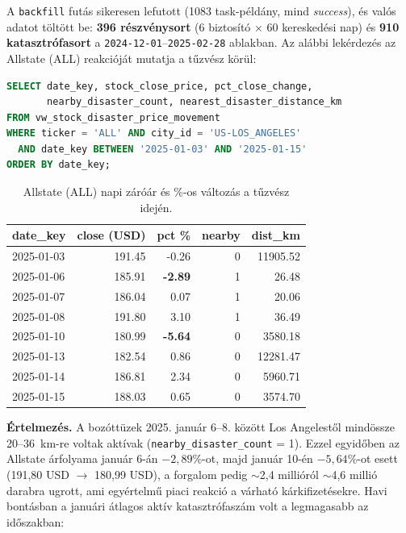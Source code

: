 \documentclass[11pt,a4paper]{article}
\begin{document}
A \texttt{backfill} futás sikeresen lefutott (1083 task-példány, mind
\emph{success}), és valós adatot töltött be: \textbf{396 részvénysort}
(6 biztosító × 60 kereskedési nap) és \textbf{910 katasztrófasort} a
\texttt{2024-12-01}--\texttt{2025-02-28} ablakban. Az alábbi lekérdezés az
Allstate (ALL) reakcióját mutatja a tűzvész körül:

\begin{lstlisting}[language=SQL]
SELECT date_key, stock_close_price, pct_close_change,
       nearby_disaster_count, nearest_disaster_distance_km
FROM vw_stock_disaster_price_movement
WHERE ticker = 'ALL' AND city_id = 'US-LOS_ANGELES'
  AND date_key BETWEEN '2025-01-03' AND '2025-01-15'
ORDER BY date_key;
\end{lstlisting}

\begin{table}[ht]
\centering\footnotesize
\begin{tabular}{@{}lrrrr@{}}
\toprule
\textbf{date\_key} & \textbf{close (USD)} & \textbf{pct \%} & \textbf{nearby} & \textbf{dist\_km} \\
\midrule
2025-01-03 & 191.45 & -0.26 & 0 & 11905.52 \\
2025-01-06 & 185.91 & \textbf{-2.89} & 1 & 26.48 \\
2025-01-07 & 186.04 & 0.07 & 1 & 20.06 \\
2025-01-08 & 191.80 & 3.10 & 1 & 36.49 \\
2025-01-10 & 180.99 & \textbf{-5.64} & 0 & 3580.18 \\
2025-01-13 & 182.54 & 0.86 & 0 & 12281.47 \\
2025-01-14 & 186.81 & 2.34 & 0 & 5960.71 \\
2025-01-15 & 188.03 & 0.65 & 0 & 3574.70 \\
\bottomrule
\end{tabular}
\caption{Allstate (ALL) napi záróár és \%-os változás a tűzvész idején.}
\end{table}
\newpage
\textbf{Értelmezés.} A bozóttüzek 2025. január 6--8. között Los Angelestől
mindössze \mbox{20--36 km}-re voltak aktívak (\texttt{nearby\_disaster\_count} = 1).
Ezzel egyidőben az Allstate árfolyama január 6-án $-2{,}89\%$-ot, majd január
10-én $-5{,}64\%$-ot esett (191,80 USD $\rightarrow$ 180,99 USD), a forgalom
pedig $\sim$2,4 millióról $\sim$4,6 millió darabra ugrott, ami egyértelmű
piaci reakció a várható kárkifizetésekre. Havi bontásban a januári átlagos
aktív katasztrófaszám volt a legmagasabb az időszakban:
\end{document}
